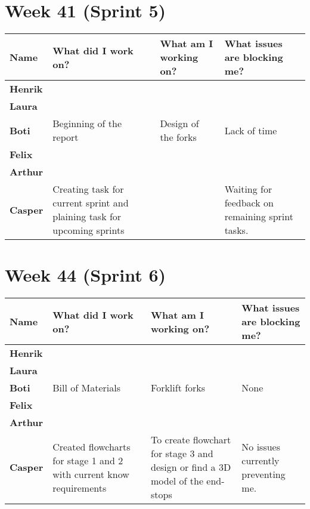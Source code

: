 \documentclass[landscape]{article}
\begin{document}
    \section{Week 41 (Sprint 5)}
    \begin{table}[H]
        \begin{center}
            \begin{tabularx}{\linewidth}{L|L|L|L}
                
                \textbf{Name} & \textbf{What did I work on?} & \textbf{What am I working on? }& \textbf{What issues are blocking me?} \\
                \hline
                \textbf{Henrik} &  &  &  \\
                \hline
                \textbf{Laura} & & & \\
                \hline
                \textbf{Boti} & Beginning of the report & Design of the forks & Lack of time \\
                \hline
                \textbf{Felix} & & & \\
                \hline
                \textbf{Arthur} & & & \\
                \hline
                \textbf{Casper} & Creating task for current sprint and plaining
                task for upcoming sprints  &  & Waiting for feedback on
                remaining sprint tasks.
            \end{tabularx}
        \end{center}
    \end{table}

    
    \section{Week 44 (Sprint 6)}
    \begin{table}[H]
        \begin{center}
            \begin{tabularx}{\linewidth}{L|L|L|L}
                
                \textbf{Name} & \textbf{What did I work on?} & \textbf{What am I working on? }& \textbf{What issues are blocking me?} \\
                \hline
                \textbf{Henrik} &  &  &  \\
                \hline
                \textbf{Laura} & & & \\
                \hline
                \textbf{Boti} & Bill of Materials & Forklift forks & None \\
                \hline
                \textbf{Felix} & & & \\
                \hline
                \textbf{Arthur} & & & \\
                \hline
                \textbf{Casper} & Created flowcharts for stage 1 and 2 with
                current know requirements & To create flowchart for stage 3 and
                design or find a 3D model of the end-stops & No issues
                currently preventing me. 
            \end{tabularx}
        \end{center}
    \end{table}
\end{document}

